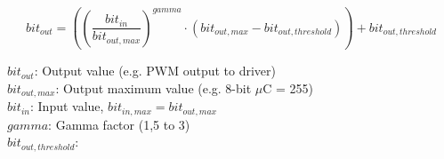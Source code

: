 \documentclass[11pt,a4paper]{article}
\begin{document}
\begin{equation}
    bit_{out} = \left( \left(\dfrac{bit_{in}}{bit_{out,max}} \right)^{gamma} \cdot 
        (bit_{out,max} - bit_{out,threshold}) \right) + bit_{out,threshold}
\end{equation}

\indent $bit_{out}$: Output value (e.g. PWM output to driver)\\
\indent $bit_{out,max}$: Output maximum value (e.g. 8-bit $\mu$C = 255) \\
\indent $bit_{in}$: Input value, $bit_{in,max} = bit_{out,max}$ \\
\indent $gamma$: Gamma factor (1,5 to 3)\\
\indent $bit_{out,threshold}$:\\

\newpage

\end{document}
